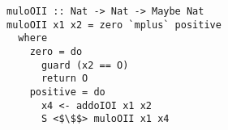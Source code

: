 \begin{figure}[!t]
  \centering
  \begin{minipage}{\columnwidth}
    \begin{lstlisting}[frame=tb]
muloOII :: Nat -> Nat -> Maybe Nat
muloOII x1 x2 = zero `mplus` positive
  where
    zero = do
      guard (x2 == O)
      return O
    positive = do
      x4 <- addoIOI x1 x2
      S <$\$$> muloOII x1 x4
    \end{lstlisting}
  \end{minipage}
\end{figure}